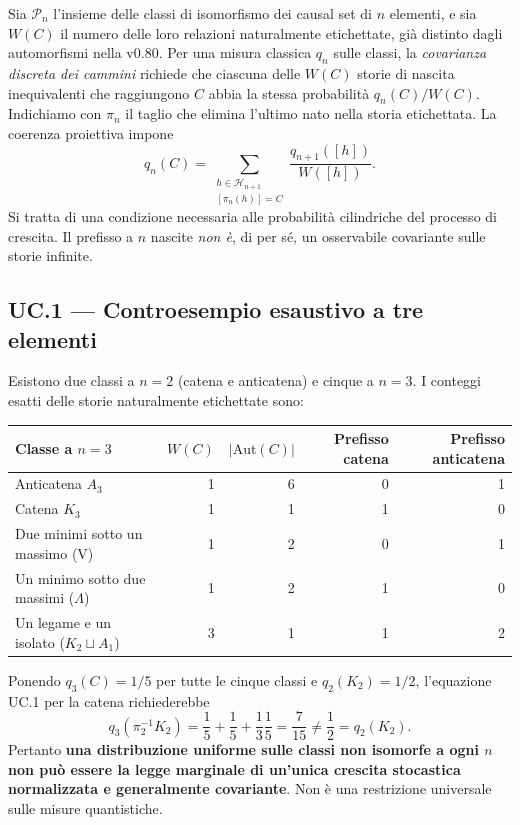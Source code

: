 \documentclass[11pt,a4paper]{article}
\begin{document}
Sia $\mathcal P_n$ l'insieme delle classi di isomorfismo dei causal set di $n$ elementi, e sia $W(C)$ il numero delle loro relazioni naturalmente etichettate, gi\`a distinto dagli automorfismi nella v0.80. Per una misura classica $q_n$ sulle classi, la \emph{covarianza discreta dei cammini} richiede che ciascuna delle $W(C)$ storie di nascita inequivalenti che raggiungono $C$ abbia la stessa probabilit\`a $q_n(C)/W(C)$. Indichiamo con $\pi_n$ il taglio che elimina l'ultimo nato nella storia etichettata. La coerenza proiettiva impone
\begin{equation}
\boxed{q_n(C)=\sum_{\substack{h\in\mathcal H_{n+1}\\[1pt] [\pi_n(h)]=C}}
\frac{q_{n+1}([h])}{W([h])}.}\tag{UC.1}
\end{equation}
Si tratta di una condizione necessaria alle probabilit\`a cilindriche del processo di crescita. Il prefisso a $n$ nascite \emph{non \`e}, di per s\'e, un osservabile covariante sulle storie infinite.

\subsection*{UC.1 --- Controesempio esaustivo a tre elementi}
Esistono due classi a $n=2$ (catena e anticatena) e cinque a $n=3$. I conteggi esatti delle storie naturalmente etichettate sono:
\begin{center}\small
\begin{tabular}{lrrrr}
\toprule
Classe a $n=3$ & $W(C)$ & $|\mathrm{Aut}(C)|$ & Prefisso catena & Prefisso anticatena\\
\midrule
Anticatena $A_3$ &1&6&0&1\\
Catena $K_3$ &1&1&1&0\\
Due minimi sotto un massimo (V)&1&2&0&1\\
Un minimo sotto due massimi ($\Lambda$)&1&2&1&0\\
Un legame e un isolato ($K_2\sqcup A_1$)&3&1&1&2\\
\bottomrule
\end{tabular}
\end{center}
Ponendo $q_3(C)=1/5$ per tutte le cinque classi e $q_2(K_2)=1/2$, l'equazione UC.1 per la catena richiederebbe
\begin{equation}
\boxed{q_3(\pi_2^{-1}K_2)=\frac15+\frac15+\frac{1}{3}\frac15
=\frac7{15}\ne\frac12=q_2(K_2).}\tag{UC.2}
\end{equation}
Pertanto \textbf{una distribuzione uniforme sulle classi non isomorfe a ogni $n$ non pu\`o essere la legge marginale di un'unica crescita stocastica normalizzata e generalmente covariante}. Non \`e una restrizione universale sulle misure quantistiche.
\end{document}
